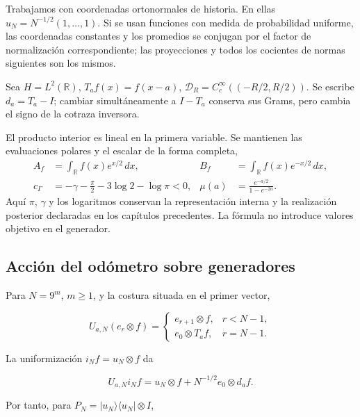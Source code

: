 Trabajamos con coordenadas ortonormales de historia. En ellas \(u_N=N^{-1/2}(1,\ldots,1)\). Si se usan funciones con medida de probabilidad uniforme, las coordenadas constantes y los promedios se conjugan por el factor de normalización correspondiente; las proyecciones y todos los cocientes de normas siguientes son los mismos.

Sea \(H=L^2(\mathbb R)\), \(T_af(x)=f(x-a)\), \(\mathcal D_R=C_c^\infty((-R/2,R/2))\). Se escribe \(d_a=T_a-I\); cambiar simultáneamente a \(I-T_a\) conserva sus Grams, pero cambia el signo de la cotraza inversora.

El producto interior es lineal en la primera variable. Se mantienen las
evaluaciones polares y el escalar de la forma completa,
\begin{equation}
\begin{aligned}
A_f&=\int_{\mathbb R}f(x)e^{x/2}\,dx,
&B_f&=\int_{\mathbb R}f(x)e^{-x/2}\,dx,\\
c_\Gamma&=-\gamma-\frac\pi2-3\log2-\log\pi<0,
&\mu(a)&=\frac{e^{-a/2}}{1-e^{-2a}}.
\end{aligned}
\label{gamma-add-def-evaluaciones}
\end{equation}
Aquí \(\pi\), \(\gamma\) y los logaritmos conservan la representación
interna y la realización posterior declaradas en los capítulos precedentes.
La fórmula no introduce valores objetivo en el generador.

\subsection{Acción del odómetro sobre generadores}
\label{gamma-add-sub-47}

Para \(N=9^m\), \(m\ge1\), y la costura situada en el primer vector,

\begin{equation}
U_{a,N}(e_r\otimes f)=
\begin{cases}
e_{r+1}\otimes f,&r<N-1,\\
e_0\otimes T_af,&r=N-1.
\end{cases}
\label{gamma-add-display-1}
\end{equation}

La uniformización \(i_Nf=u_N\otimes f\) da

\begin{equation}
U_{a,N}i_Nf
=u_N\otimes f+N^{-1/2}e_0\otimes d_af.
\label{gamma-add-display-2}
\end{equation}

Por tanto, para \(P_N=|u_N\rangle\langle u_N|\otimes I\),


